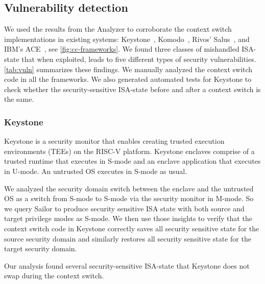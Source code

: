 \subsection{Vulnerability detection} 
\label{sec:vuln-det}
We used the results from the Analyzer 
to corroborate the context switch implementations in existing systems: Keystone~\cite{keystone}, Komodo~\cite{komodo}, Rivos' Salus~\cite{rivos-salus}, and IBM's ACE~\cite{ibm-ace}, see \autoref{fig:cc-frameworks}. 
We found three classes of mishandled ISA-state that when exploited, leads to five different types of security vulnerabilities. 
\autoref{tab:vuln} summarizes these findings. 
We manually analyzed the context switch code in all the frameworks. 
We also generated automated tests for Keystone to check whether the security-sensitive ISA-state before and after a context switch is the same.


\subsubsection{Keystone}
Keystone \cite{keystone} is a security monitor that enables creating trusted execution environments (TEEs) on the RISC-V platform. 
Keystone enclaves comprise of a trusted runtime that executes in S-mode and an enclave application that executes in U-mode. An untrusted OS executes in S-mode as usual. 

We analyzed the security domain switch between the enclave and the untrusted OS as a switch from S-mode to S-mode via the security monitor in M-mode. 
So we query Sailor to produce security sensitive ISA state with both source and target privilege modes as S-mode. 
We then use those insights to verify that the context switch code in Keystone correctly saves all security sensitive state for the source security domain and similarly restores all security sensitive state for the target security domain. 

Our analysis found several security-sensitive ISA-state that Keystone does not swap during the context switch. 

